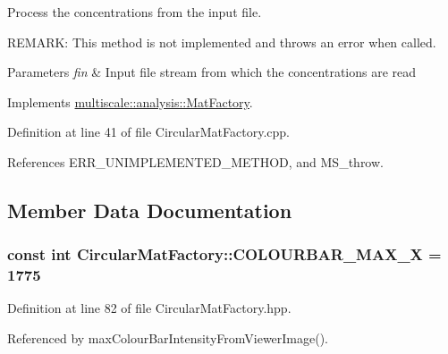 \-Process the concentrations from the input file. 

\-R\-E\-M\-A\-R\-K\-: \-This method is not implemented and throws an error when called.


\begin{DoxyParams}{\-Parameters}
{\em fin} & \-Input file stream from which the concentrations are read \\
\hline
\end{DoxyParams}


\-Implements \hyperlink{classmultiscale_1_1analysis_1_1MatFactory_a0493c87d7b74619a95f14c0e31a3e178}{multiscale\-::analysis\-::\-Mat\-Factory}.



\-Definition at line 41 of file \-Circular\-Mat\-Factory.\-cpp.



\-References \-E\-R\-R\-\_\-\-U\-N\-I\-M\-P\-L\-E\-M\-E\-N\-T\-E\-D\-\_\-\-M\-E\-T\-H\-O\-D, and \-M\-S\-\_\-throw.



\subsection{\-Member \-Data \-Documentation}
\hypertarget{classmultiscale_1_1analysis_1_1CircularMatFactory_a57e022b6cb2066b59e6f1988986ce6ad}{
\subsubsection[{\-C\-O\-L\-O\-U\-R\-B\-A\-R\-\_\-\-M\-A\-X\-\_\-\-X}]{\setlength{\rightskip}{0pt plus 5cm}const int {\bf \-Circular\-Mat\-Factory\-::\-C\-O\-L\-O\-U\-R\-B\-A\-R\-\_\-\-M\-A\-X\-\_\-\-X} = 1775}}\label{classmultiscale_1_1analysis_1_1CircularMatFactory_a57e022b6cb2066b59e6f1988986ce6ad}


\-Definition at line 82 of file \-Circular\-Mat\-Factory.\-hpp.



\-Referenced by max\-Colour\-Bar\-Intensity\-From\-Viewer\-Image().

